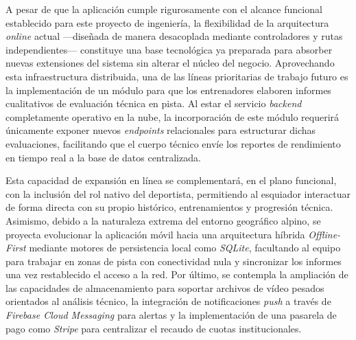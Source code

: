 A pesar de que la aplicación cumple rigurosamente con el alcance funcional establecido para este proyecto de ingeniería, la flexibilidad de la arquitectura \textit{online} actual —diseñada de manera desacoplada mediante controladores y rutas independientes— constituye una base tecnológica ya preparada para absorber nuevas extensiones del sistema sin alterar el núcleo del negocio. Aprovechando esta infraestructura distribuida, una de las líneas prioritarias de trabajo futuro es la implementación de un módulo para que los entrenadores elaboren informes cualitativos de evaluación técnica en pista. Al estar el servicio \textit{backend} completamente operativo en la nube, la incorporación de este módulo requerirá únicamente exponer nuevos \textit{endpoints} relacionales para estructurar dichas evaluaciones, facilitando que el cuerpo técnico envíe los reportes de rendimiento en tiempo real a la base de datos centralizada.

Esta capacidad de expansión en línea se complementará, en el plano funcional, con la inclusión del rol nativo del deportista, permitiendo al esquiador interactuar de forma directa con su propio histórico, entrenamientos y progresión técnica. Asimismo, debido a la naturaleza extrema del entorno geográfico alpino, se proyecta evolucionar la aplicación móvil hacia una arquitectura híbrida \textit{Offline-First} mediante motores de persistencia local como \textit{SQLite}, facultando al equipo para trabajar en zonas de pista con conectividad nula y sincronizar los informes una vez restablecido el acceso a la red. Por último, se contempla la ampliación de las capacidades de almacenamiento para soportar archivos de vídeo pesados orientados al análisis técnico, la integración de notificaciones \textit{push} a través de \textit{Firebase Cloud Messaging} para alertas y la implementación de una pasarela de pago como \textit{Stripe} para centralizar el recaudo de cuotas institucionales.